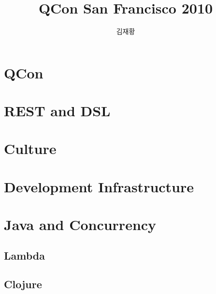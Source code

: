 \documentclass[10pt,unicode,serif,compress,slidetop]{beamer}
\title{QCon San Francisco 2010}
\author{김재황}
\institute{소프트웨어 센터}
\begin{document}
\begin{frame}[plain]
    \titlepage
\end{frame}

\section{QCon}


\section{REST and DSL}



\section{Culture}



\section{Development Infrastructure}




\section{Java and Concurrency}

\subsection{Lambda}


\subsection{Clojure}



% 
\end{document}
